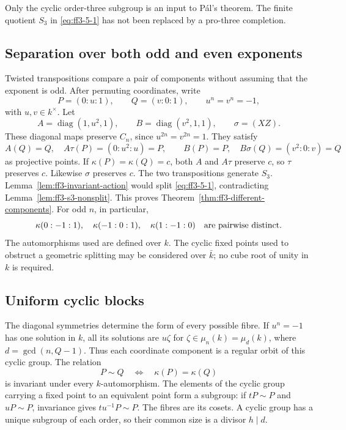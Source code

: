 Only the cyclic order-three subgroup is an input to Pál's theorem.
The finite quotient \(S_3\) in \eqref{eq:ff3-5-1} has not been
replaced by a pro-three completion.

\subsection{Separation over both odd and even exponents}
\label{subsec:ff3-canonical}

Twisted transpositions compare a pair of components without assuming
that the exponent is odd. After permuting coordinates, write
\[
 P=(0:u:1),\qquad Q=(v:0:1),\qquad u^n=v^n=-1,
\]
with \(u,v\in k^\times\). Let
\[
 A=\operatorname{diag}(1,u^2,1),\qquad
 B=\operatorname{diag}(v^2,1,1),\qquad \sigma=(XZ).
\]
These diagonal maps preserve \(C_n\), since \(u^{2n}=v^{2n}=1\).
They satisfy
\[
 A(Q)=Q,\quad A\tau(P)=(0:u^2:u)=P,\qquad
 B(P)=P,\quad B\sigma(Q)=(v^2:0:v)=Q
\]
as projective points.
If \(\kappa(P)=\kappa(Q)=c\), both \(A\) and \(A\tau\) preserve \(c\),
so \(\tau\) preserves \(c\). Likewise \(\sigma\) preserves \(c\).
The two transpositions generate \(S_3\).
Lemma~\ref{lem:ff3-invariant-action} would split
\eqref{eq:ff3-5-1}, contradicting
Lemma~\ref{lem:ff3-s3-nonsplit}. This proves
Theorem~\ref{thm:ff3-different-components}. For odd \(n\), in particular,
\begin{equation}
 \kappa(0:-1:1),\quad\kappa(-1:0:1),\quad\kappa(1:-1:0)
 \quad\hbox{are pairwise distinct}.
 \label{eq:ff3-6-1}
\end{equation}
The automorphisms used are defined over \(k\). The cyclic fixed points
used to obstruct a geometric splitting may be considered over \(\bar k\);
no cube root of unity in \(k\) is required.

\subsection{Uniform cyclic blocks}
\label{subsec:ff3-components}

The diagonal symmetries determine the form of every possible fibre.
If \(u^n=-1\) has one solution in \(k\), all its solutions are
\(u\zeta\) for \(\zeta\in\mu_n(k)=\mu_d(k)\), where \(d=\gcd(n,Q-1)\).
Thus each coordinate component is a regular orbit of this cyclic group.
The relation
\[
 P\sim Q\quad\Longleftrightarrow\quad\kappa(P)=\kappa(Q)
\]
is invariant under every \(k\)-automorphism. The elements of the cyclic
group carrying a fixed point to an equivalent point form a subgroup:
if \(tP\sim P\) and \(uP\sim P\), invariance gives \(tu^{-1}P\sim P\).
The fibres are its cosets. A cyclic group has a unique subgroup of
each order, so their common size is a divisor \(h\mid d\).

